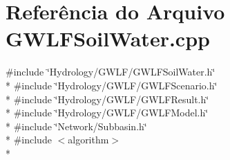 \section{Referência do Arquivo G\+W\+L\+F\+Soil\+Water.\+cpp}
\label{_g_w_l_f_soil_water_8cpp}
{\ttfamily \#include \char`\"{}Hydrology/\+G\+W\+L\+F/\+G\+W\+L\+F\+Soil\+Water.\+h\char`\"{}}\\*
{\ttfamily \#include \char`\"{}Hydrology/\+G\+W\+L\+F/\+G\+W\+L\+F\+Scenario.\+h\char`\"{}}\\*
{\ttfamily \#include \char`\"{}Hydrology/\+G\+W\+L\+F/\+G\+W\+L\+F\+Result.\+h\char`\"{}}\\*
{\ttfamily \#include \char`\"{}Hydrology/\+G\+W\+L\+F/\+G\+W\+L\+F\+Model.\+h\char`\"{}}\\*
{\ttfamily \#include \char`\"{}Network/\+Subbasin.\+h\char`\"{}}\\*
{\ttfamily \#include $<$algorithm$>$}\\*
